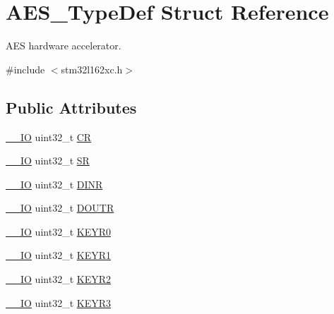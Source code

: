 \hypertarget{struct_a_e_s___type_def}{\section{A\-E\-S\-\_\-\-Type\-Def Struct Reference}
\label{struct_a_e_s___type_def}
}


A\-E\-S hardware accelerator.  




{\ttfamily \#include $<$stm32l162xc.\-h$>$}

\subsection*{Public Attributes}
\begin{DoxyCompactItemize}
\item 
\hyperlink{core__sc300_8h_aec43007d9998a0a0e01faede4133d6be}{\-\_\-\-\_\-\-I\-O} uint32\-\_\-t \hyperlink{struct_a_e_s___type_def_ad95f1a38ad551672f1d6c59299b99c1a}{C\-R}
\item 
\hyperlink{core__sc300_8h_aec43007d9998a0a0e01faede4133d6be}{\-\_\-\-\_\-\-I\-O} uint32\-\_\-t \hyperlink{struct_a_e_s___type_def_a567d574d42c57f0f5850eaada4eb1f31}{S\-R}
\item 
\hyperlink{core__sc300_8h_aec43007d9998a0a0e01faede4133d6be}{\-\_\-\-\_\-\-I\-O} uint32\-\_\-t \hyperlink{struct_a_e_s___type_def_a8df0ec8c0eae4b42c1ae5b7e01044c26}{D\-I\-N\-R}
\item 
\hyperlink{core__sc300_8h_aec43007d9998a0a0e01faede4133d6be}{\-\_\-\-\_\-\-I\-O} uint32\-\_\-t \hyperlink{struct_a_e_s___type_def_a93e69a0e82607ec9480d0e395b236ead}{D\-O\-U\-T\-R}
\item 
\hyperlink{core__sc300_8h_aec43007d9998a0a0e01faede4133d6be}{\-\_\-\-\_\-\-I\-O} uint32\-\_\-t \hyperlink{struct_a_e_s___type_def_a4fcb96eb7820d80f3f9027d3d19e0e48}{K\-E\-Y\-R0}
\item 
\hyperlink{core__sc300_8h_aec43007d9998a0a0e01faede4133d6be}{\-\_\-\-\_\-\-I\-O} uint32\-\_\-t \hyperlink{struct_a_e_s___type_def_a2755d099b5556ca661cad9c32eced4a4}{K\-E\-Y\-R1}
\item 
\hyperlink{core__sc300_8h_aec43007d9998a0a0e01faede4133d6be}{\-\_\-\-\_\-\-I\-O} uint32\-\_\-t \hyperlink{struct_a_e_s___type_def_a415157c12229e50b4ae5e2dedfa37069}{K\-E\-Y\-R2}
\item 
\hyperlink{core__sc300_8h_aec43007d9998a0a0e01faede4133d6be}{\-\_\-\-\_\-\-I\-O} uint32\-\_\-t \hyperlink{struct_a_e_s___type_def_ac4ed72833846f489d10cf751f552de7a}{K\-E\-Y\-R3}

\end{DoxyCompactItemize}
